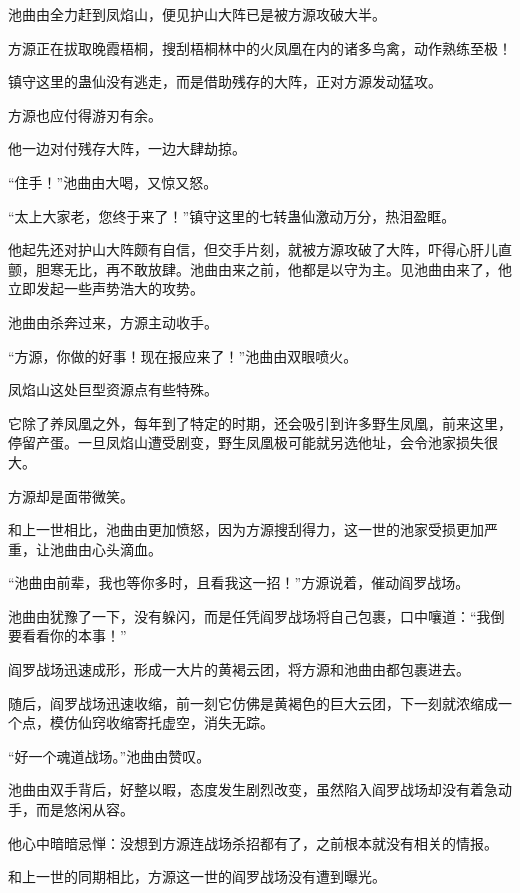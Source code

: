 
\begin{this_body}



池曲由全力赶到凤焰山，便见护山大阵已是被方源攻破大半。

方源正在拔取晚霞梧桐，搜刮梧桐林中的火凤凰在内的诸多鸟禽，动作熟练至极！

镇守这里的蛊仙没有逃走，而是借助残存的大阵，正对方源发动猛攻。

方源也应付得游刃有余。

他一边对付残存大阵，一边大肆劫掠。

“住手！”池曲由大喝，又惊又怒。

“太上大家老，您终于来了！”镇守这里的七转蛊仙激动万分，热泪盈眶。

他起先还对护山大阵颇有自信，但交手片刻，就被方源攻破了大阵，吓得心肝儿直颤，胆寒无比，再不敢放肆。池曲由来之前，他都是以守为主。见池曲由来了，他立即发起一些声势浩大的攻势。

池曲由杀奔过来，方源主动收手。

“方源，你做的好事！现在报应来了！”池曲由双眼喷火。

凤焰山这处巨型资源点有些特殊。

它除了养凤凰之外，每年到了特定的时期，还会吸引到许多野生凤凰，前来这里，停留产蛋。一旦凤焰山遭受剧变，野生凤凰极可能就另选他址，会令池家损失很大。

方源却是面带微笑。

和上一世相比，池曲由更加愤怒，因为方源搜刮得力，这一世的池家受损更加严重，让池曲由心头滴血。

“池曲由前辈，我也等你多时，且看我这一招！”方源说着，催动阎罗战场。

池曲由犹豫了一下，没有躲闪，而是任凭阎罗战场将自己包裹，口中嚷道：“我倒要看看你的本事！”

阎罗战场迅速成形，形成一大片的黄褐云团，将方源和池曲由都包裹进去。

随后，阎罗战场迅速收缩，前一刻它仿佛是黄褐色的巨大云团，下一刻就浓缩成一个点，模仿仙窍收缩寄托虚空，消失无踪。

“好一个魂道战场。”池曲由赞叹。

池曲由双手背后，好整以暇，态度发生剧烈改变，虽然陷入阎罗战场却没有着急动手，而是悠闲从容。

他心中暗暗忌惮：没想到方源连战场杀招都有了，之前根本就没有相关的情报。

和上一世的同期相比，方源这一世的阎罗战场没有遭到曝光。


\end{this_body}
